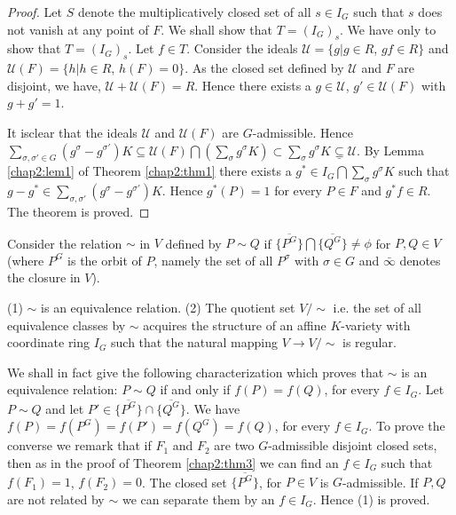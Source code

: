 \begin{proof}
 Let $S$ denote the multiplicatively closed set of all $s \in I_G$
 such that $s$ does not vanish at any point of $F$. We shall show that
 $T= (I_G)_s$. We have only to show that $T = (I_G)_s$. Let $f
 \in T$. Consider the ideals $\mathcal{U} = \bigg\{ g \bigg | g \in R$,
 $gf \in R \bigg\}$ and $ \mathcal{U} (F) = \bigg\{ h \bigg|h \in R$,
 $h(F) = 0 \bigg\}$. 
 As the closed set defined by $\mathcal{U}$ and $F$ are disjoint, we
 have, $\mathcal{U} + \mathcal{U} (F)= R$. Hence there exists a $g \in
 \mathcal{U}$, $g' \in \mathcal{U}(F)$ with $g + g' = 1$.  
 
 
 It is\pageoriginale clear that the ideals $\mathcal{U}$ and 
 $\mathcal{U} (F) $ are  
 $G$-admissible. Hence $\sum\limits_{\sigma, \sigma' \in G}
 (g^{\sigma} - g^{\sigma'}) K \subseteq \mathcal{U}(F) \bigcap
 (\sum\limits_{\sigma} g^{\sigma} K) \subset
 \sum\limits_{\sigma} g^{\sigma} K \underline 
 {\subseteq} \mathcal{U}$. By Lemma \ref{chap2:lem1} of Theorem
 \ref{chap2:thm1} there exists a $ 
 g^{*} \in  I_G \bigcap \sum\limits_\sigma 
 g^{\sigma}K$ such that $g - g^{*} \in \sum\limits_{\sigma, \sigma'} 
 (g^{\sigma} - g^{\sigma'}) K$. Hence $g^{*}(P) = 1$ for every $P \in
 F$ and $g^{*} f \in R$. The theorem is proved.  
\end{proof}

Consider  the relation $ \sim $ in $V$ defined by  $P \sim Q$ if
$\big\{\overline{P^{G}}\big\} \bigcap  \big\{\overline{Q^{G}}\big\}
\neq \phi$ for $P, Q \in V$ (where $P^{G}$ is the orbit of $P$, namely
the set of all $ P^{\sigma}$ with $\sigma \in G$ and $\bar{\infty}$
denotes the closure in $V$).  

\begin{thm} %
 {\rm (1)} $\sim$ is an equivalence relation. {\rm (2)} The quotient
 set $V/\sim$ 
  i.e. the set of all equivalence classes by $\sim$ acquires the 
  structure of an affine $K$-variety with coordinate ring $I_G$ such
  that the natural mapping $V \rightarrow V/\sim$ is regular.  
 \end{thm} 

\medskip
{} 
We shall in fact give the following characterization which 
 proves that $\sim$ is an equivalence relation: $P \sim Q$ if and
 only if $f(P) = f(Q)$, for every $f \in I_G$. Let $P \sim Q$ and let
 $P' \in \big\{\overline{P^{G}}\big\} \cap
 \big\{\overline{Q^{G}}\big\}$. We have $f(P) = f(P^{G}) = f(P') =
 f(Q^{G}) = f(Q)$, for every $ f \in I_G$. To prove the converse we
 remark that if $F_{1}$ and $F_{2}$ are two $G$-admissible disjoint
 closed sets, then as in the proof of Theorem \ref{chap2:thm3} we can
 find an $f \in 
 I_G$ such that $f(F_{1}) = 1$, $f(F_{2}) = 0$. The closed set $
 \big\{\overline{P^{G}}\big\}$, for $P \in V$ is $G$-admissible. If
 $P, Q$ are not related by $\sim$ we can separate them by an $f \in
 I_G$. Hence (1) is proved.  

